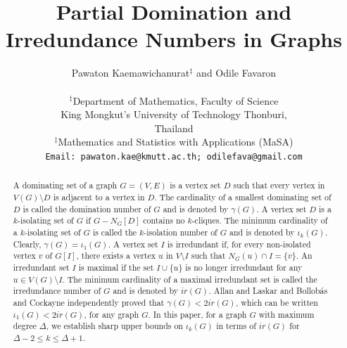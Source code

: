 \documentclass[11pt]{article}
\newcommand{\2}{ \vspace{0.2cm} }
\newcommand{\1}{ \vspace{0.1cm} }
\begin{document}
\title{Partial Domination and Irredundance Numbers in Graphs}


\author{Pawaton Kaemawichanurat$^{\ddagger}$ and Odile Favaron
\\ \\
$^{\ddagger}$Department of Mathematics, Faculty of Science\\
King Mongkut's University of Technology Thonburi,\\
Thailand\\
$^{\ddagger}$Mathematics and Statistics with Applications (MaSA)\\
\small \tt Email: pawaton.kae@kmutt.ac.th; odilefava@gmail.com}

\date{}
\maketitle


%

\begin{abstract}
A dominating set of a graph $G=(V,E)$ is a vertex set $D$ such that every vertex in $V(G) \setminus D$ is adjacent to a vertex in $D$. The cardinality of a smallest dominating set of $D$ is called the domination number of $G$ and is denoted by $\gamma(G)$.  A vertex set $D$ is a $k$-isolating set of $G$ if $G - N_{G}[D]$ contains no $k$-cliques. The minimum cardinality of a $k$-isolating set of $G$ is called the $k$-isolation number of $G$ and is denoted by $\iota_{k}(G)$. Clearly, $\gamma(G) = \iota_{1}(G)$. A vertex set $I$ is  irredundant if, for every non-isolated vertex $v$ of $G[I]$, there exists a vertex $u$ in $V \setminus I$ such that $N_{G}(u) \cap I = \{v\}$. An irredundant set $I$ is maximal if the set $I \cup \{u\}$ is no longer irredundant for any $u \in V(G) \setminus I$. The minimum cardinality of a maximal irredundant set is called the irredundance number of $G$ and is denoted by $ir(G)$. Allan and Laskar \cite{AL1978} and Bollob\'{a}s and Cockayne \cite{BoCo1979} independently proved that $\gamma(G) < 2ir(G)$, which can be written $\iota _1(G) < 2ir(G)$, for any graph $G$.
In this paper, for a graph $G$ with maximum degree $\Delta$, we establish sharp upper bounds on $\iota_{k}(G)$ in terms of $ir(G)$ for $\Delta - 2 \leq k \leq \Delta + 1$.
\end{abstract}
\end{document}

